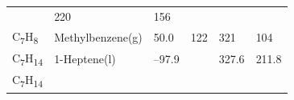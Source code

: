 \documentclass[
  9pt,
]{extbook}
\theoremstyle{definition}
\theoremstyle{definition}
\theoremstyle{definition}
\theoremstyle{remark}
\begin{document}
\begin{longtable}[]{@{}llllll@{}}
\begin{minipage}[t]{0.15\columnwidth}
\strut
\end{minipage} & \begin{minipage}[t]{0.14\columnwidth}\raggedright
220\strut
\end{minipage} & \begin{minipage}[t]{0.14\columnwidth}\raggedright
156\strut
\end{minipage}\tabularnewline
\begin{minipage}[t]{0.07\columnwidth}\raggedright
C\textsubscript{7}H\textsubscript{8}\strut
\end{minipage} & \begin{minipage}[t]{0.17\columnwidth}\raggedright
Methylbenzene(g)\strut
\end{minipage} & \begin{minipage}[t]{0.15\columnwidth}\raggedright
50.0\strut
\end{minipage} & \begin{minipage}[t]{0.15\columnwidth}\raggedright
122\strut
\end{minipage} & \begin{minipage}[t]{0.14\columnwidth}\raggedright
321\strut
\end{minipage} & \begin{minipage}[t]{0.14\columnwidth}\raggedright
104\strut
\end{minipage}\tabularnewline
\begin{minipage}[t]{0.07\columnwidth}\raggedright
C\textsubscript{7}H\textsubscript{14}\strut
\end{minipage} & \begin{minipage}[t]{0.17\columnwidth}\raggedright
1-Heptene(l)\strut
\end{minipage} & \begin{minipage}[t]{0.15\columnwidth}\raggedright
--97.9\strut
\end{minipage} & \begin{minipage}[t]{0.15\columnwidth}\raggedright
\strut
\end{minipage} & \begin{minipage}[t]{0.14\columnwidth}\raggedright
327.6\strut
\end{minipage} & \begin{minipage}[t]{0.14\columnwidth}\raggedright
211.8\strut
\end{minipage}\tabularnewline
\begin{minipage}[t]{0.07\columnwidth}\raggedright
C\textsubscript{7}H\textsubscript{14}\strut
\end{minipage} & \begin{minipage}[t]{0.17\columnwidth}\raggedright

\end{minipage}
\end{longtable}
\end{document}
